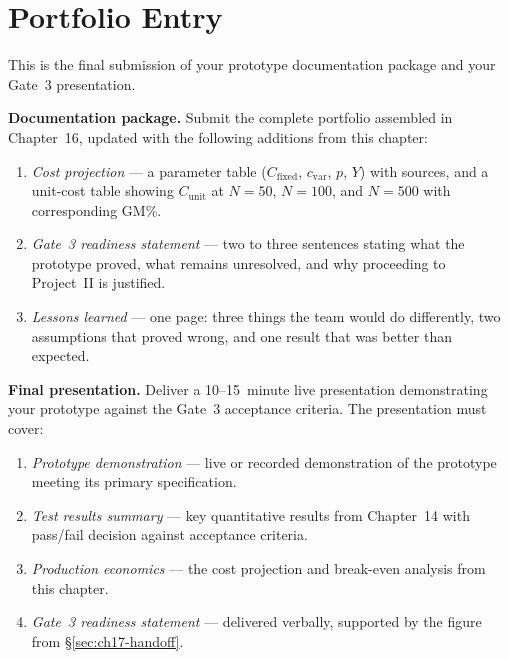 \section*{Portfolio Entry}
\label{sec:ch17-portfolio}

This is the final submission of your prototype documentation package and
your Gate~3 presentation.

\textbf{Documentation package.}
Submit the complete portfolio assembled in Chapter~16, updated with the
following additions from this chapter:

\begin{enumerate}
  \item[(a)] \textit{Cost projection} --- a parameter table
        ($C_{\text{fixed}}$, $c_{\text{var}}$, $p$, $Y$) with sources,
        and a unit-cost table showing $C_{\text{unit}}$ at $N = 50$,
        $N = 100$, and $N = 500$ with corresponding GM\%.

  \item[(b)] \textit{Gate~3 readiness statement} --- two to three sentences
        stating what the prototype proved, what remains unresolved, and
        why proceeding to Project~II is justified.

  \item[(c)] \textit{Lessons learned} --- one page: three things the team
        would do differently, two assumptions that proved wrong, and one
        result that was better than expected.
\end{enumerate}

\textbf{Final presentation.}
Deliver a 10--15~minute live presentation demonstrating your prototype
against the Gate~3 acceptance criteria.
The presentation must cover:

\begin{enumerate}
  \item[(d)] \textit{Prototype demonstration} --- live or recorded
        demonstration of the prototype meeting its primary specification.

  \item[(e)] \textit{Test results summary} --- key quantitative results
        from Chapter~14 with pass/fail decision against acceptance criteria.

  \item[(f)] \textit{Production economics} --- the cost projection and
        break-even analysis from this chapter.

  \item[(g)] \textit{Gate~3 readiness statement} --- delivered verbally,
        supported by the figure from \S\ref{sec:ch17-handoff}.
\end{enumerate}


